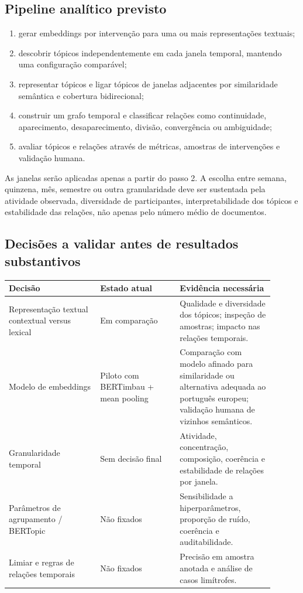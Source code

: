 \documentclass[11pt,a4paper]{article}
\begin{document}
\subsection{Pipeline analítico previsto}

\begin{enumerate}
  \item gerar embeddings por intervenção para uma ou mais representações textuais;
  \item descobrir tópicos independentemente em cada janela temporal, mantendo uma configuração comparável;
  \item representar tópicos e ligar tópicos de janelas adjacentes por similaridade semântica e cobertura bidirecional;
  \item construir um grafo temporal e classificar relações como continuidade, aparecimento, desaparecimento, divisão, convergência ou ambiguidade;
  \item avaliar tópicos e relações através de métricas, amostras de intervenções e validação humana.
\end{enumerate}

As janelas serão aplicadas apenas a partir do passo 2. A escolha entre semana, quinzena, mês, semestre ou outra granularidade deve ser sustentada pela atividade observada, diversidade de participantes, interpretabilidade dos tópicos e estabilidade das relações, não apenas pelo número médio de documentos.

\subsection{Decisões a validar antes de resultados substantivos}

\begin{longtable}{p{0.31\linewidth}p{0.27\linewidth}p{0.32\linewidth}}
\toprule
Decisão & Estado atual & Evidência necessária \\
\midrule
\endhead
Representação textual contextual versus lexical & Em comparação & Qualidade e diversidade dos tópicos; inspeção de amostras; impacto nas relações temporais. \\
\addlinespace
Modelo de embeddings & Piloto com BERTimbau + mean pooling & Comparação com modelo afinado para similaridade ou alternativa adequada ao português europeu; validação humana de vizinhos semânticos. \\
\addlinespace
Granularidade temporal & Sem decisão final & Atividade, concentração, composição, coerência e estabilidade de relações por janela. \\
\addlinespace
Parâmetros de agrupamento / BERTopic & Não fixados & Sensibilidade a hiperparâmetros, proporção de ruído, coerência e auditabilidade. \\
\addlinespace
Limiar e regras de relações temporais & Não fixados & Precisão em amostra anotada e análise de casos limítrofes. \\
\bottomrule
\end{longtable}
\end{document}
